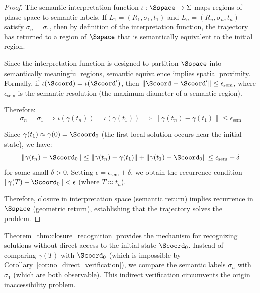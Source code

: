 \begin{proof}
The semantic interpretation function $\iota: \Sspace \to \Sigma$ maps regions of phase space to semantic labels. If $L_1 = (R_1, \sigma_1, t_1)$ and $L_n = (R_n, \sigma_n, t_n)$ satisfy $\sigma_n = \sigma_1$, then by definition of the interpretation function, the trajectory has returned to a region of $\Sspace$ that is semantically equivalent to the initial region.

Since the interpretation function is designed to partition $\Sspace$ into semantically meaningful regions, semantic equivalence implies spatial proximity. Formally, if $\iota(\Scoord) = \iota(\Scoord')$, then $\|\Scoord - \Scoord'\| \leq \epsilon_{\text{sem}}$, where $\epsilon_{\text{sem}}$ is the semantic resolution (the maximum diameter of a semantic region).

Therefore:
\begin{equation}
\sigma_n = \sigma_1 \implies \iota(\gamma(t_n)) = \iota(\gamma(t_1)) \implies \|\gamma(t_n) - \gamma(t_1)\| \leq \epsilon_{\text{sem}}
\end{equation}

Since $\gamma(t_1) \approx \gamma(0) = \Scoord_0$ (the first local solution occurs near the initial state), we have:
\begin{equation}
\|\gamma(t_n) - \Scoord_0\| \leq \|\gamma(t_n) - \gamma(t_1)\| + \|\gamma(t_1) - \Scoord_0\| \leq \epsilon_{\text{sem}} + \delta
\end{equation}
for some small $\delta > 0$. Setting $\epsilon = \epsilon_{\text{sem}} + \delta$, we obtain the recurrence condition $\|\gamma(T) - \Scoord_0\| < \epsilon$ (where $T \approx t_n$).

Therefore, closure in interpretation space (semantic return) implies recurrence in $\Sspace$ (geometric return), establishing that the trajectory solves the problem.
\end{proof}

\begin{remark}
\label{rem:indirect_verification}
Theorem~\ref{thm:closure_recognition} provides the mechanism for recognizing solutions without direct access to the initial state $\Scoord_0$. Instead of comparing $\gamma(T)$ with $\Scoord_0$ (which is impossible by Corollary~\ref{cor:no_direct_verification}), we compare the semantic labels $\sigma_n$ with $\sigma_1$ (which are both observable). This indirect verification circumvents the origin inaccessibility problem.
\end{remark}

